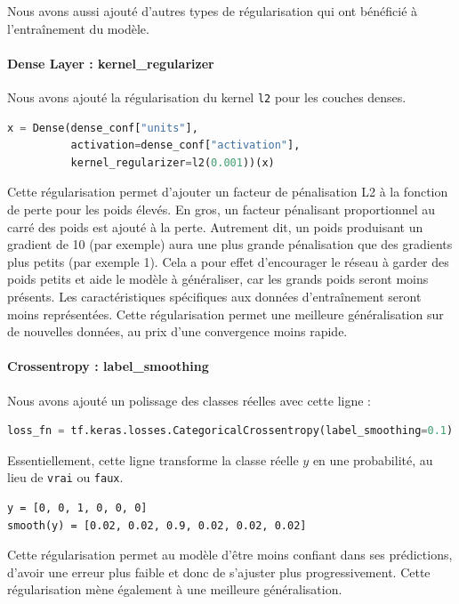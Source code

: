\documentclass{article}
\begin{document}
Nous avons aussi ajouté d'autres types de régularisation qui ont bénéficié à l'entraînement du modèle.

\paragraph{Dense Layer : kernel\_regularizer}

Nous avons ajouté la régularisation du kernel \texttt{l2} pour les couches denses.
\begin{lstlisting}[language=Python]
x = Dense(dense_conf["units"],
          activation=dense_conf["activation"],
          kernel_regularizer=l2(0.001))(x)
\end{lstlisting}

Cette régularisation permet d’ajouter un facteur de pénalisation L2 à la fonction de perte pour les poids élevés. En gros, un facteur pénalisant proportionnel au carré des poids est ajouté à la perte. Autrement dit, un poids produisant un gradient de 10 (par exemple) aura une plus grande pénalisation que des gradients plus petits (par exemple 1). Cela a pour effet d’encourager le réseau à garder des poids petits et aide le modèle à généraliser, car les grands poids seront moins présents. Les caractéristiques spécifiques aux données d’entraînement seront moins représentées. Cette régularisation permet une meilleure généralisation sur de nouvelles données, au prix d’une convergence moins rapide.

\paragraph{Crossentropy : label\_smoothing}

Nous avons ajouté un polissage des classes réelles avec cette ligne :
\begin{lstlisting}[language=Python]
loss_fn = tf.keras.losses.CategoricalCrossentropy(label_smoothing=0.1)
\end{lstlisting}

Essentiellement, cette ligne transforme la classe réelle $y$ en une probabilité, au lieu de \texttt{vrai} ou \texttt{faux}.

\begin{verbatim}
y = [0, 0, 1, 0, 0, 0]
smooth(y) = [0.02, 0.02, 0.9, 0.02, 0.02, 0.02]
\end{verbatim}

Cette régularisation permet au modèle d’être moins confiant dans ses prédictions, d’avoir une erreur plus faible et donc de s’ajuster plus progressivement. Cette régularisation mène également à une meilleure généralisation.
\end{document}
